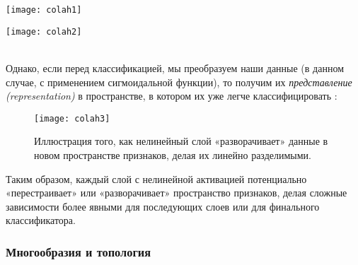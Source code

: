 \begin{minipage}{0.35\textwidth}
    \texttt{[image: colah1]}
    \label{fig:colah1}
\end{minipage}
\hspace{80pt}
\begin{minipage}{0.35\textwidth}
    \texttt{[image: colah2]}
    \label{fig:colah2}
\end{minipage}\\

Однако, если перед классификацией, мы преобразуем наши данные 
(в данном случае, с применением сигмоидальной функции), 
то получим их \textit{представление (representation)} в 
пространстве, в котором их уже легче классифицировать \cite{colah}:

\begin{figure}[h!]
    \centering
    \texttt{[image: colah3]}
    \caption{Иллюстрация того, как нелинейный слой «разворачивает» 
    данные в новом пространстве признаков, делая их линейно разделимыми.}
    \label{fig:colah3}
\end{figure}

Таким образом, каждый слой с нелинейной активацией потенциально «перестраивает» или 
«разворачивает» пространство признаков, делая сложные зависимости более явными для 
последующих слоев или для финального классификатора.

\subsubsection{\color{red}Многообразия и топология}







